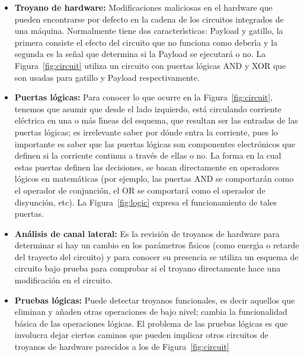 \begin{itemize}
	\item \textbf{Troyano de hardware:}
	      Modificaciones maliciosas en el hardware que pueden encontrarse por defecto
	      en la cadena de los circuitos integrados de una m\'aquina. Normalmente tiene
	      dos caracter\'{\i}sticas: Payload y gatillo, la primera consiste el efecto del
	      circuito que no funciona como deber\'{\i}a y la segunda es la se\~nal que determina
	      si la Payload se ejecutar\'a o no. La Figura~\ref{fig:circuit} utiliza un
	      circuito con puertas l\'ogicas AND y XOR que son usadas para gatillo y
	      Payload respectivamente.

	\item \textbf{Puertas l\'ogicas:}
	      Para conocer lo que ocurre en la Figura~\ref{fig:circuit}, tenemos que
	      asumir que desde el lado izquierdo, est\'a circulando corriente el\'ectrica en
	      una o m\'as l\'{\i}neas del esquema, que resultan ser las entradas de las puertas
	      l\'ogicas; es irrelevante saber por d\'onde entra la corriente, pues lo
	      importante es saber que las puertas l\'ogicas son componentes electr\'onicos
	      que definen si la corriente continua a trav\'es de ellas o no. La forma en la
	      cual estas puertas definen las decisiones, se basan directamente en
	      operadores l\'ogicos en matem\'aticas (por ejemplo, las puertas AND se
	      comportar\'an como el operador de conjunci\'on, el OR se comportar\'a como el
	      operador de disyunci\'on, etc). La Figura~\ref{fig:logic} expresa el
	      funcionamiento de tales puertas.

	\item \textbf{An\'alisis de canal lateral:}
	      Es la revisi\'on de troyanos de hardware para determinar si hay un cambio en
	      los par\'ametros f\'{\i}sicos (como energ\'{\i}a o retarde del trayecto del circuito)
	      y para conocer su presencia se utiliza un esquema de circuito bajo prueba
	      para comprobar si el troyano directamente hace una modificaci\'on en el
	      circuito.

	\item \textbf{Pruebas l\'ogicas:}
	      Puede detectar troyanos funcionales, es decir aquellos que eliminan y a\~naden
	      otras operaciones de bajo nivel; cambia la funcionalidad b\'asica de las
	      operaciones l\'ogicas. El problema de las pruebas l\'ogicas es que involucra
	      dejar ciertos caminos que pueden implicar otros circuitos de troyanos de
	      hardware parecidos a los de Figura~\ref{fig:circuit}


\end{itemize}
